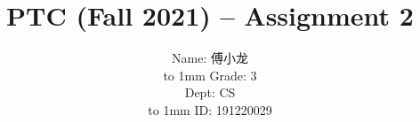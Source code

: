 \documentclass[a4paper,UTF8]{article}
\theoremstyle{definition}
\begin{document}
\begin{CJK}{UTF8}{gkai}
\title{PTC (Fall 2021) -- Assignment 2}
\author{
    \begin{minipage}[b]{0.3\linewidth}
      \begin{flushright}
        Name: 傅小龙\\%
        \vbox to 1mm{}
        Grade: 3%
      \end{flushright}
    \end{minipage}
    \hfill
    \begin{minipage}[b]{0.3\linewidth}
      \begin{flushright}
        Dept: CS\\%
        \vbox to 1mm{}
        ID: 191220029%
      \end{flushright}
    \end{minipage}
}
\date{}
\maketitle

\setlength{\baselineskip}{18pt}
\begin{flushleft}

\end{flushleft}
\end{CJK}
\end{document}
